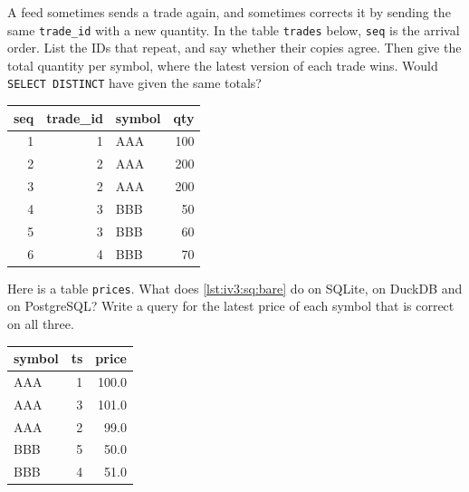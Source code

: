 \begin{question}\label{iq:iv3:sql-and-data:6}
A feed sometimes sends a trade again, and sometimes corrects it by sending the same \texttt{trade\_id} with a new quantity. In the table \texttt{trades} below, \texttt{seq} is the arrival order. List the IDs that repeat, and say whether their copies agree. Then give the total quantity per symbol, where the latest version of each trade wins. Would \texttt{SELECT DISTINCT} have given the same totals?
\begin{center}\small
\begin{tabular}{rrlr}
seq & trade\_id & symbol & qty\\\hline
1 & 1 & AAA & 100\\
2 & 2 & AAA & 200\\
3 & 2 & AAA & 200\\
4 & 3 & BBB & 50\\
5 & 3 & BBB & 60\\
6 & 4 & BBB & 70
\end{tabular}
\end{center}
\end{question}

\begin{question}\label{iq:iv3:sql-and-data:7}
Here is a table \texttt{prices}. What does \cref{lst:iv3:sq:bare} do on SQLite, on DuckDB and on PostgreSQL? Write a query for the latest price of each symbol that is correct on all three.
\begin{center}\small
\begin{tabular}{lrr}
symbol & ts & price\\\hline
AAA & 1 & 100.0\\
AAA & 3 & 101.0\\
AAA & 2 & 99.0\\
BBB & 5 & 50.0\\
BBB & 4 & 51.0
\end{tabular}
\end{center}
\label{lst:iv3:sq:bare}
\end{question}

